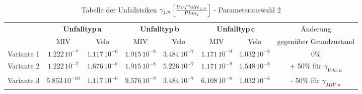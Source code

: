 %
%
%
%

\begin{table}[h!]
\scriptsize
\flushleft
\renewcommand{\arraystretch}{1.2} 
%
%
\begin{tabular}{@{} lccccccc @{}}  \\  
\toprule 
           & \multicolumn{2}{c}{\textbf{Unfalltyp\,a}} & \multicolumn{2}{c}{\textbf{Unfalltyp\,b}} & \multicolumn{2}{c}{\textbf{Unfalltyp\,c}} & Änderung  \\
           & MIV       & Velo      & MIV       & Velo      & MIV       & Velo    &  gegenüber Grundzustand \\
\midrule
Variante 1&\(1.222\,\mathrm{10^{-7}}\)&\(1.117\,\mathrm{10^{-6}}\)&\(1.915\,\mathrm{10^{-8}}\)&\(3.484\,\mathrm{10^{-7}}\)&\(1.171\,\mathrm{10^{-9}}\)&\(1.032\,\mathrm{10^{-8}}\)& 0\% \\
Variante 2 &\(1.222\,\mathrm{10^{-7}}\)&\(1.676\,\mathrm{10^{-6}}\)&\(1.915\,\mathrm{10^{-8}}\)&\(5.226\,\mathrm{10^{-7}}\)&\(1.171\,\mathrm{10^{-9}}\)&\(1.548\,\mathrm{10^{-8}}\)& + 50\% für \(\gamma_{Velo,n}\)    \\
Variante 3 &\(5.853\,\mathrm{10^{-10}}\)&\(1.117\,\mathrm{10^{-6}}\)&\(9.576\,\mathrm{10^{-9}}\)&\(3.484\,\mathrm{10^{-7}}\)&\(6.108\,\mathrm{10^{-8}}\)&\(1.032\,\mathrm{10^{-8}}\)& - 50\% für \(\gamma_{MIV,n}\) 		\\
\bottomrule
\end{tabular}
\caption[Tabelle der Unfallrisiken - Parameterauswahl 2]{Tabelle der Unfallrisiken $\gamma_{j,n}\,\Bigl[\frac{Unf"alle_{j,n}}{Pkm_{j}}\Bigl]$ - Parameterauswahl 2}
\label{tab:t-09-01-Unfallrisiko-Zustand-2}
\end{table}





%


